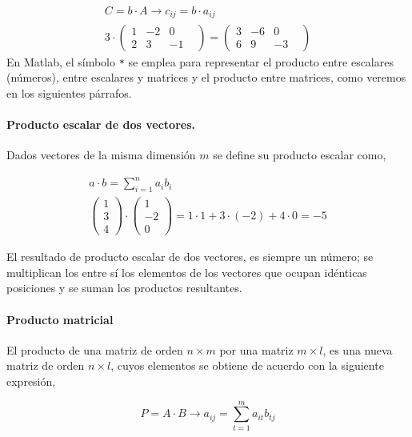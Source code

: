 \begin{gather*}
C=b\cdot A \rightarrow c_{ij}=b\cdot a_{ij}\\
3\cdot
\begin{pmatrix}
1& -2& 0\\
2& 3& -1&
\end{pmatrix}=
\begin{pmatrix}
3& -6& 0\\
6& 9& -3&
\end{pmatrix} 
\end{gather*}
En Matlab, el símbolo \texttt{*} se emplea para representar el producto entre escalares (números), entre escalares y matrices y el producto entre matrices, como veremos en los siguientes párrafos.

\paragraph{Producto escalar de dos vectores.} Dados vectores de la misma dimensión $m$ se define su producto escalar como, 

\begin{gather*}
a\cdot b=\sum_{i=1}^na_ib_i\\
\begin{pmatrix}
1\\
3\\
4
\end{pmatrix}\cdot
\begin{pmatrix}
1\\
-2\\
0
\end{pmatrix}
=1\cdot 1+3 \cdot (-2)+ 4 \cdot 0= -5
\end{gather*}

El resultado de producto escalar de dos vectores, es siempre un número; se multiplican los entre sí los elementos de los vectores que ocupan idénticas posiciones y se suman los productos resultantes. 


\paragraph{Producto matricial}
El producto de una matriz de orden $n\times m$ por una matriz $m\times l$, es una nueva matriz de orden $n\times l$, cuyos elementos se obtiene de acuerdo con la siguiente expresión,

\begin{equation*}
P=A\cdot B \rightarrow a_{ij}=\sum_{t=1}^m a_{it}b_{tj}
\end{equation*}

